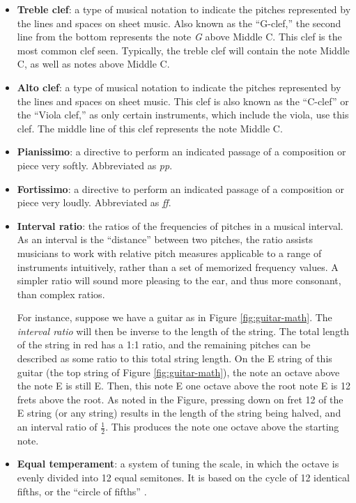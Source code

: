 \begin{itemize}
    \item {\textbf{Treble clef}: a type of musical notation to indicate the pitches represented by the lines and spaces on sheet music. Also known as the ``G-clef,'' the second line from the bottom represents the note \textit{G} above Middle C. This clef is the most common clef seen. Typically, the treble clef will contain the note Middle C, as well as notes above Middle C.}
    \item {\textbf{Alto clef}: a type of musical notation to indicate the pitches represented by the lines and spaces on sheet music. This clef is also known as the ``C-clef'' or the ``Viola clef,'' as only certain instruments, which include the viola, use this clef. The middle line of this clef represents the note Middle C.}
    \item {\textbf{Pianissimo}: a directive to perform an indicated passage of a composition or piece very softly. Abbreviated as \textit{pp}.}
    \item {\textbf{Fortissimo}: a directive to perform an indicated passage of a composition or piece very loudly. Abbreviated as \textit{ff}.}
    \item {\textbf{Interval ratio}: the ratios of the frequencies of pitches in a musical interval. As an interval is the ``distance'' between two pitches, the ratio assists musicians to work with relative pitch measures applicable to a range of instruments intuitively, rather than a set of memorized frequency values. A simpler ratio will sound more pleasing to the ear, and thus more consonant, than complex ratios.}
    
    For instance, suppose we have a guitar as in Figure \ref{fig:guitar-math}. The \textit{interval ratio} will then be inverse to the length of the string. The total length of the string in red has a 1:1 ratio, and the remaining pitches can be described as some ratio to this total string length. On the E string of this guitar (the top string of Figure \ref{fig:guitar-math}), the note an octave above the note E is still E. Then, this note E one octave above the root note E is 12 frets above the root. As noted in the Figure, pressing down on fret 12 of the E string (or any string) results in the length of the string being halved, and an interval ratio of $\frac{1}{2}$. This produces the note one octave above the starting note.
    \item {\textbf{Equal temperament}: a system of tuning the scale, in which the octave is evenly divided into 12 equal semitones. It is based on the cycle of 12 identical fifths, or the ``circle of fifths'' \cite{Cochrane_2011}.}
    

\end{itemize}
